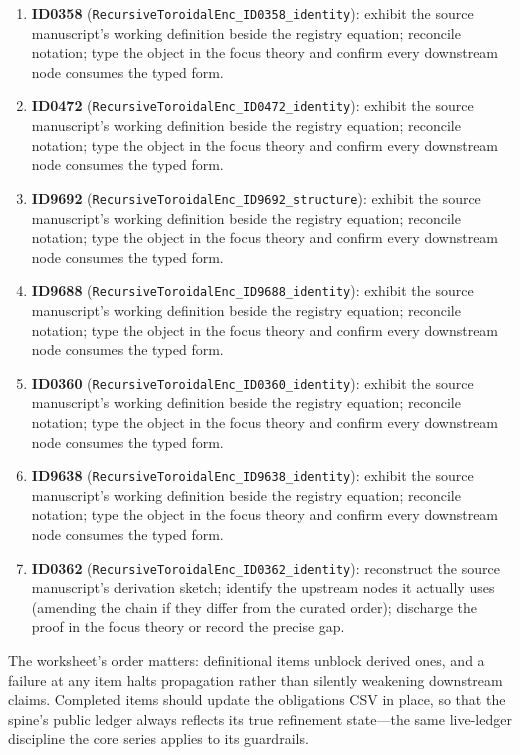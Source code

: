 \documentclass[11pt]{article}
\theoremstyle{remark}
\begin{document}
\begin{enumerate}
\item \textbf{ID0358} (\texttt{RecursiveToroidalEnc\_ID0358\_identity}): exhibit the source manuscript's working definition beside the registry equation; reconcile notation; type the object in the focus theory and confirm every downstream node consumes the typed form.
\item \textbf{ID0472} (\texttt{RecursiveToroidalEnc\_ID0472\_identity}): exhibit the source manuscript's working definition beside the registry equation; reconcile notation; type the object in the focus theory and confirm every downstream node consumes the typed form.
\item \textbf{ID9692} (\texttt{RecursiveToroidalEnc\_ID9692\_structure}): exhibit the source manuscript's working definition beside the registry equation; reconcile notation; type the object in the focus theory and confirm every downstream node consumes the typed form.
\item \textbf{ID9688} (\texttt{RecursiveToroidalEnc\_ID9688\_identity}): exhibit the source manuscript's working definition beside the registry equation; reconcile notation; type the object in the focus theory and confirm every downstream node consumes the typed form.
\item \textbf{ID0360} (\texttt{RecursiveToroidalEnc\_ID0360\_identity}): exhibit the source manuscript's working definition beside the registry equation; reconcile notation; type the object in the focus theory and confirm every downstream node consumes the typed form.
\item \textbf{ID9638} (\texttt{RecursiveToroidalEnc\_ID9638\_identity}): exhibit the source manuscript's working definition beside the registry equation; reconcile notation; type the object in the focus theory and confirm every downstream node consumes the typed form.
\item \textbf{ID0362} (\texttt{RecursiveToroidalEnc\_ID0362\_identity}): reconstruct the source manuscript's derivation sketch; identify the upstream nodes it actually uses (amending the chain if they differ from the curated order); discharge the proof in the focus theory or record the precise gap.
\end{enumerate}

The worksheet's order matters: definitional items unblock derived ones, and a failure at any item halts propagation rather than silently weakening downstream claims. Completed items should update the obligations CSV in place, so that the spine's public ledger always reflects its true refinement state---the same live-ledger discipline the core series applies to its guardrails.
\end{document}
